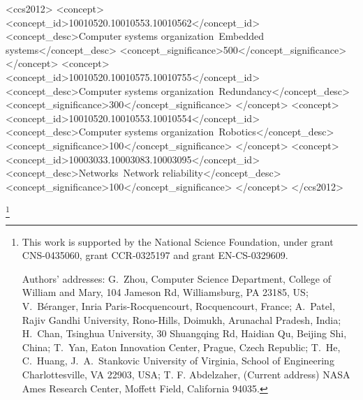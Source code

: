 \documentclass[acmtog, authorversion]{acmart}
\begin{document}
%
%
\begin{CCSXML}
<ccs2012>
 <concept>
  <concept_id>10010520.10010553.10010562</concept_id>
  <concept_desc>Computer systems organization~Embedded systems</concept_desc>
  <concept_significance>500</concept_significance>
 </concept>
 <concept>
  <concept_id>10010520.10010575.10010755</concept_id>
  <concept_desc>Computer systems organization~Redundancy</concept_desc>
  <concept_significance>300</concept_significance>
 </concept>
 <concept>
  <concept_id>10010520.10010553.10010554</concept_id>
  <concept_desc>Computer systems organization~Robotics</concept_desc>
  <concept_significance>100</concept_significance>
 </concept>
 <concept>
  <concept_id>10003033.10003083.10003095</concept_id>
  <concept_desc>Networks~Network reliability</concept_desc>
  <concept_significance>100</concept_significance>
 </concept>
</ccs2012>  
\end{CCSXML}


%
%




\thanks{This work is supported by the National Science Foundation,
  under grant CNS-0435060, grant CCR-0325197 and grant EN-CS-0329609.

  Authors' addresses: G.~Zhou, Computer Science Department, College of
  William and Mary, 104 Jameson Rd, Williamsburg, PA 23185, US;
  V.~B\'eranger, Inria Paris-Rocquencourt, Rocquencourt, France;
  A.~Patel, Rajiv Gandhi University, Rono-Hills, Doimukh, Arunachal
  Pradesh, India; H.~Chan, Tsinghua University, 30 Shuangqing Rd,
  Haidian Qu, Beijing Shi, China; T.~Yan, Eaton Innovation Center,
  Prague, Czech Republic; T.~He, C.~Huang, J.~A.~Stankovic University
  of Virginia, School of Engineering Charlottesville, VA 22903, USA;
  T. F. Abdelzaher, (Current address) NASA Ames Research Center,
  Moffett Field, California 94035.}

\maketitle


\end{document}
